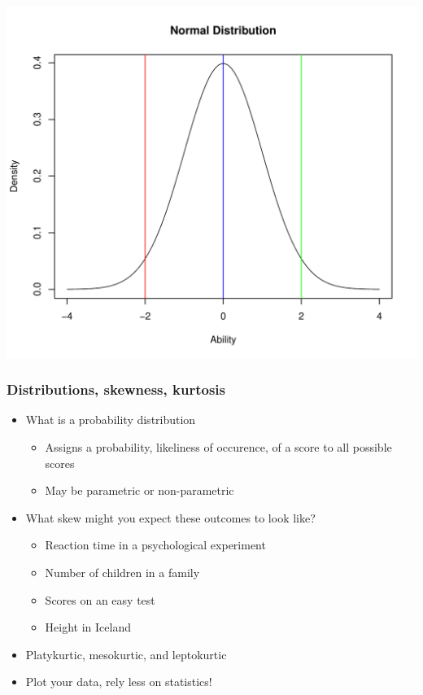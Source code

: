 \documentclass[dvipsnames]{beamer}\usepackage[]{graphicx}\usepackage[]{color}
\makeatletter
\def\maxwidth{ %
  \ifdim\Gin@nat@width>\linewidth
    \linewidth
  \else
    \Gin@nat@width
  \fi
}
\newenvironment{knitrout}{}{} %
\makeatother
\begin{document}
\begin{frame}
\begin{knitrout}
\color{fgcolor}

{\centering \includegraphics[width=\maxwidth]{figure/unnamed-chunk-8-1} 

}



\end{knitrout}
\end{frame}

\begin{frame}
\frametitle{Distributions, skewness, kurtosis}
  \begin{itemize}
    \item What is a probability distribution
  \begin{itemize}
    \item Assigns a probability, likeliness of occurence, of a score to all possible scores
    \item May be parametric or non-parametric
  \end{itemize}
  \item What skew might you expect these outcomes to look like?
    \begin{itemize}
    \item Reaction time in a psychological experiment
    \item Number of children in a family
    \item Scores on an easy test
    \item Height in Iceland
    \end{itemize}
  \item Platykurtic, mesokurtic, and leptokurtic
  \item Plot your data, rely less on statistics!
  \end{itemize}
\end{frame}
\end{document}

